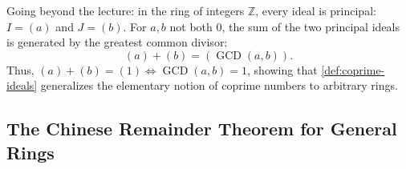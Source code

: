 \begin{content}

\begin{steps}
Going beyond the lecture: in the ring of integers $\mathbb{Z}$, every ideal is principal: $I = (a)$ and $J = (b)$.
For $a, b$ not both $0$, the sum of the two principal ideals is generated by the greatest common divisor:
\[
(a) + (b) = (\operatorname{GCD}(a, b)).
\]
Thus, $(a) + (b) = (1) \iff \operatorname{GCD}(a, b) = 1$, showing that \cref{def:coprime-ideals} generalizes the elementary notion of coprime numbers to arbitrary rings.
\end{steps}
\end{content}

\subsection{The Chinese Remainder Theorem for General Rings}

